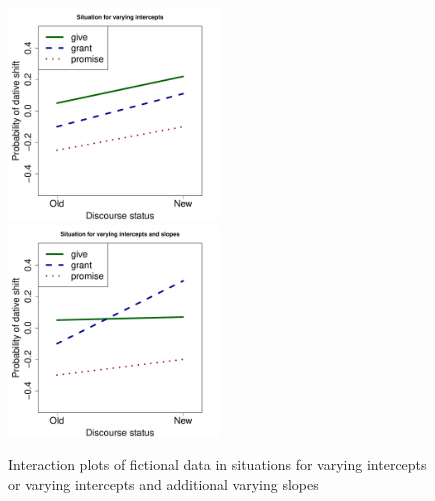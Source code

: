 \begin{figure}[!htpb]
  \centering
  \includegraphics[width=0.5\textwidth]{graphics/var_int}~\includegraphics[width=0.5\textwidth]{graphics/var_int_slope}
  \caption{Interaction plots of fictional data in situations for varying intercepts or varying intercepts and additional varying slopes}
  \label{fig:varintlsope}
\end{figure}

